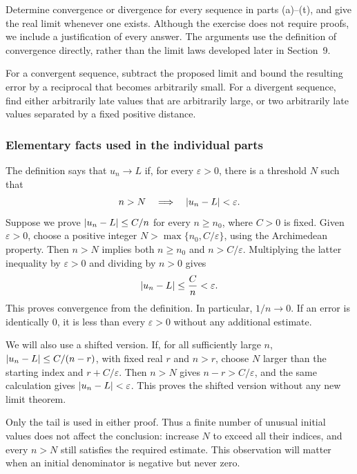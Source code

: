 
\goal Determine convergence or divergence for every sequence in
parts (a)--(t), and give the real limit whenever one exists.
Although the exercise does not require proofs, we include a justification
of every answer. The arguments use the definition of convergence
directly, rather than the limit laws developed later in Section~9.

\idea For a convergent sequence, subtract the proposed limit and
bound the resulting error by a reciprocal that becomes arbitrarily
small. For a divergent sequence, find either arbitrarily late values
that are arbitrarily large, or two arbitrarily late values separated
by a fixed positive distance.

\subsubsection*{Elementary facts used in the individual parts}

The definition says that $u_n\to L$ if, for every $\varepsilon>0$,
there is a threshold $N$ such that
\[
 n>N\quad\Longrightarrow\quad\left|u_n-L\right|<\varepsilon.
\]
Suppose we prove $\left|u_n-L\right|\leq C/n$ for every $n\geq n_0$,
where $C>0$ is fixed. Given $\varepsilon>0$, choose a positive
integer $N>\max\{n_0,C/\varepsilon\}$, using the Archimedean
property. Then $n>N$ implies both $n\geq n_0$ and
$n>C/\varepsilon$. Multiplying the latter inequality by
$\varepsilon>0$ and dividing by $n>0$ gives
\[
 \left|u_n-L\right|\leq\frac Cn<\varepsilon.
\]
This proves convergence from the definition. In particular,
$1/n\to0$. If an error is identically $0$, it is less than every
$\varepsilon>0$ without any additional estimate.

We will also use a shifted version. If, for all sufficiently large
$n$, $\left|u_n-L\right|\leq C/(n-r)$, with fixed real $r$ and $n>r$,
choose $N$ larger than the starting index and $r+C/\varepsilon$.
Then $n>N$ gives $n-r>C/\varepsilon$, and the same calculation
gives $\left|u_n-L\right|<\varepsilon$. This proves the shifted version
without any new limit theorem.

Only the tail is used in either proof. Thus a finite number of unusual
initial values does not affect the conclusion: increase $N$ to exceed
all their indices, and every $n>N$ still satisfies the required
estimate. This observation will matter when an initial denominator
is negative but never zero.


